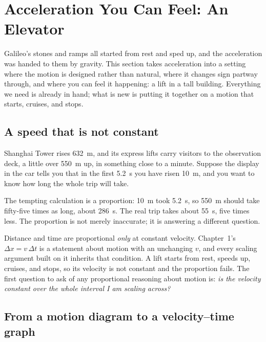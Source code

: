 \documentclass[11pt,twoside,openany]{book}
\begin{document}
\section{Acceleration You Can Feel: An Elevator}
\label{sec:elevator}

Galileo's stones and ramps all started from rest and sped up, and the acceleration was handed to them by gravity. This section takes acceleration into a setting where the motion is designed rather than natural, where it changes sign partway through, and where you can feel it happening: a lift in a tall building. Everything we need is already in hand; what is new is putting it together on a motion that starts, cruises, and stops.

\subsection{A speed that is not constant}

Shanghai Tower rises \SI{632}{\metre}, and its express lifts carry visitors to the observation deck, a little over \SI{550}{\metre} up, in something close to a minute. Suppose the display in the car tells you that in the first \SI{5.2}{\second} you have risen \SI{10}{\metre}, and you want to know how long the whole trip will take.

The tempting calculation is a proportion: \SI{10}{\metre} took \SI{5.2}{\second}, so \SI{550}{\metre} should take fifty-five times as long, about \SI{286}{\second}. The real trip takes about \SI{55}{\second}, five times less. The proportion is not merely inaccurate; it is answering a different question.

\begin{keyidea}
Distance and time are proportional \emph{only} at constant velocity. Chapter~1's $\Delta x = v\,\Delta t$ is a statement about motion with an unchanging $v$, and every scaling argument built on it inherits that condition. A lift starts from rest, speeds up, cruises, and stops, so its velocity is not constant and the proportion fails. The first question to ask of any proportional reasoning about motion is: \emph{is the velocity constant over the whole interval I am scaling across?}
\end{keyidea}

\subsection{From a motion diagram to a velocity--time graph}
\end{document}
